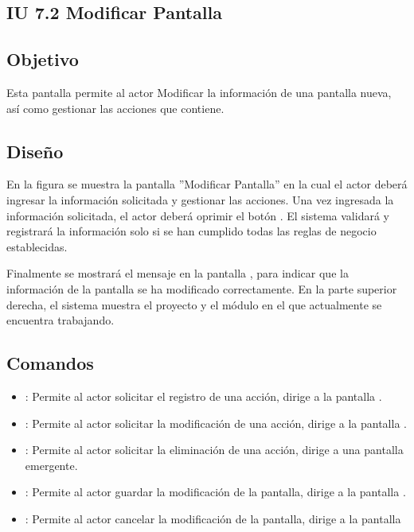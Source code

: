 \subsection{IU 7.2 Modificar Pantalla}

\subsection{Objetivo}
	Esta pantalla permite al actor Modificar la información de una pantalla nueva, así como gestionar las acciones que contiene.
\subsection{Diseño}
	En la figura  se muestra la pantalla ''Modificar Pantalla'' en la cual el actor deberá ingresar la información solicitada y gestionar las acciones.
	Una vez ingresada la información solicitada, el actor deberá oprimir el botón  . El sistema validará y registrará la información solo si se han cumplido todas las reglas de negocio establecidas.
	
	Finalmente se mostrará el mensaje  en la pantalla , para indicar que la información de la pantalla se ha modificado correctamente.
	En la parte superior derecha, el sistema muestra el proyecto y el módulo en el que actualmente se encuentra trabajando.

\subsection{Comandos}
\begin{itemize}
	\item {}: Permite al actor solicitar el registro de una acción, dirige a la pantalla .
	\item \editar [Modificar]: Permite al actor solicitar la modificación de una acción, dirige a la pantalla .
	\item \eliminar [Eliminar]: Permite al actor solicitar la eliminación de una acción, dirige a una pantalla emergente.
	\item {}: Permite al actor guardar la modificación de la pantalla, dirige a la pantalla .
	\item {}: Permite al actor cancelar la modificación de la pantalla, dirige a la pantalla 
\end{itemize}

